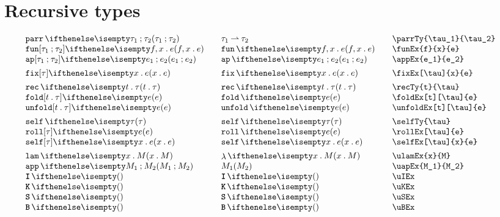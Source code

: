 \documentclass[11pt]{article}
\begin{document}
\section*{Recursive types}
\begin{small}
  \begin{displaymath}
    \begin{array}{l@{\qquad}l@{\qquad}l@{\qquad}l}
      \parrTy{\tau_1}{\tau_2} & \parrTy*{\tau_1}{\tau_2} & \verb|\parrTy{\tau_1}{\tau_2}| \\
      \funEx{f}{x}{e}         & \funEx*{f}{x}{e}         & \verb|\funEx{f}{x}{e}|         \\
      \appEx{e_1}{e_2}        & \appEx*{e_1}{e_2}        & \verb|\appEx{e_1}{e_2}|        \\[1ex]

      \fixEx[\tau]{x}{e}      & \fixEx*[\tau]{x}{e}      & \verb|\fixEx[\tau]{x}{e}|      \\[1ex]

      \recTy{t}{\tau}         & \recTy*{t}{\tau}         & \verb|\recTy{t}{\tau}|         \\
      \foldEx[t][\tau]{e}     & \foldEx*{e}              & \verb|\foldEx[t][\tau]{e}|     \\
      \unfoldEx[t][\tau]{e}   & \unfoldEx*{e}            & \verb|\unfoldEx[t][\tau]{e}|   \\[1ex]

      \selfTy{\tau}           & \selfTy*{\tau}           & \verb|\selfTy{\tau}|           \\
      \rollEx[\tau]{e}        & \rollEx*{e}              & \verb|\rollEx[\tau]{e}|        \\
      \selfEx[\tau]{x}{e}     & \selfEx*{x}{e}           & \verb|\selfEx[\tau]{x}{e}|     \\[1ex]

      \ulamEx{x}{M}           & \ulamEx*{x}{M}           & \verb|\ulamEx{x}{M}|           \\
      \uapEx{M_1}{M_2}        & \uapEx*{M_1}{M_2}        & \verb|\uapEx{M_1}{M_2}|        \\
      \uIEx                   & \uIEx*                   & \verb|\uIEx|                   \\
      \uKEx                   & \uKEx*                   & \verb|\uKEx|                   \\
      \uSEx                   & \uSEx*                   & \verb|\uSEx|                   \\
      \uBEx                   & \uBEx*                   & \verb|\uBEx|
    \end{array}
  \end{displaymath}
\end{small}
\end{document}
